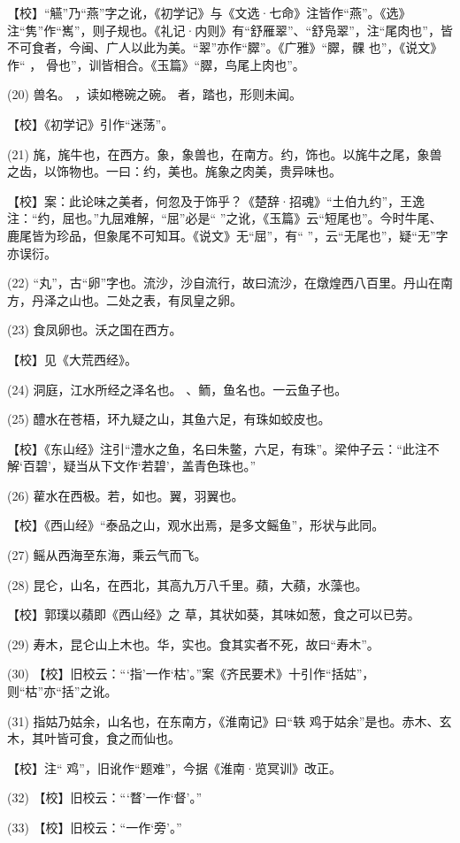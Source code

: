 \documentclass[12pt,UTF8]{ctexbook}
\begin{document}
【校】“觾”乃“燕”字之讹，《初学记》与《文选·七命》注皆作“燕”。《选》注“隽”作“嶲”，则子规也。《礼记·内则》有“舒雁翠”、“舒凫翠”，注“尾肉也”，皆不可食者，今闽、广人以此为美。“翠”亦作“臎”。《广雅》“臎，髁 也”，《说文》作“ ， 骨也”，训皆相合。《玉篇》“臎，鸟尾上肉也”。

(20) 兽名。 ，读如棬碗之碗。 者，踏也，形则未闻。

【校】《初学记》引作“迷荡”。

(21) 旄，旄牛也，在西方。象，象兽也，在南方。约，饰也。以旄牛之尾，象兽之齿，以饰物也。一曰：约，美也。旄象之肉美，贵异味也。

【校】案：此论味之美者，何忽及于饰乎？《楚辞·招魂》“土伯九约”，王逸注：“约，屈也。”九屈难解，“屈”必是“ ”之讹，《玉篇》云“短尾也”。今时牛尾、鹿尾皆为珍品，但象尾不可知耳。《说文》无“屈”，有“ ”，云“无尾也”，疑“无”字亦误衍。

(22) “丸”，古“卵”字也。流沙，沙自流行，故曰流沙，在燉煌西八百里。丹山在南方，丹泽之山也。二处之表，有凤皇之卵。

(23) 食凤卵也。沃之国在西方。

【校】见《大荒西经》。

(24) 洞庭，江水所经之泽名也。 、鲕，鱼名也。一云鱼子也。

(25) 醴水在苍梧，环九疑之山，其鱼六足，有珠如蛟皮也。

【校】《东山经》注引“澧水之鱼，名曰朱鳖，六足，有珠”。梁仲子云：“此注不解‘百碧’，疑当从下文作‘若碧’，盖青色珠也。”

(26) 雚水在西极。若，如也。翼，羽翼也。

【校】《西山经》“泰品之山，观水出焉，是多文鳐鱼”，形状与此同。

(27) 鳐从西海至东海，乘云气而飞。

(28) 昆仑，山名，在西北，其高九万八千里。蘋，大蘋，水藻也。

【校】郭璞以蘋即《西山经》之 草，其状如葵，其味如葱，食之可以已劳。

(29) 寿木，昆仑山上木也。华，实也。食其实者不死，故曰“寿木”。

(30) 【校】旧校云：“‘指’一作‘枯’。”案《齐民要术》十引作“括姑”，则“枯”亦“括”之讹。

(31) 指姑乃姑余，山名也，在东南方，《淮南记》曰“轶 鸡于姑余”是也。赤木、玄木，其叶皆可食，食之而仙也。

【校】注“ 鸡”，旧讹作“题难”，今据《淮南·览冥训》改正。

(32) 【校】旧校云：“‘瞀’一作‘督’。”

(33) 【校】旧校云：“一作‘旁’。”
\end{document}
